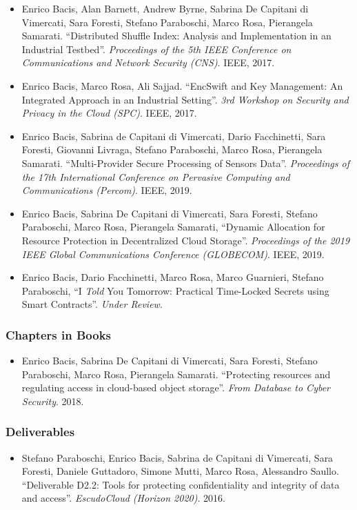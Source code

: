 \documentclass[a4paper]{article}
\begin{document}
\begin{sloppy}
\begin{itemize}
		\item Enrico Bacis, Alan Barnett, Andrew Byrne, Sabrina De Capitani di Vimercati, Sara Foresti, Stefano Paraboschi, Marco Rosa, Pierangela Samarati. ``Distributed Shuffle Index: Analysis and Implementation in an Industrial Testbed''. {\em Proceedings of the 5th IEEE Conference on Communications and Network Security (CNS)}. IEEE, 2017.
		
		\item Enrico Bacis, Marco Rosa, Ali Sajjad. ``EncSwift and Key Management: An Integrated Approach in an Industrial Setting''. {\em 3rd Workshop on Security and Privacy in the Cloud (SPC)}. IEEE, 2017.
		
		\item  Enrico Bacis, Sabrina de Capitani di Vimercati, Dario Facchinetti, Sara Foresti, Giovanni Livraga, Stefano Paraboschi, Marco Rosa, Pierangela Samarati. ``Multi-Provider Secure Processing of Sensors Data''. {\em Proceedings of the 17th International Conference on Pervasive Computing and Communications (Percom)}. IEEE, 2019.
		
		\item Enrico Bacis, Sabrina De Capitani di Vimercati, Sara Foresti, Stefano Paraboschi, Marco Rosa, Pierangela Samarati, ``Dynamic Allocation for Resource Protection in Decentralized Cloud Storage''. {\em Proceedings of the 2019 IEEE Global Communications Conference (GLOBECOM)}. IEEE, 2019.
		
		\item Enrico Bacis, Dario Facchinetti, Marco Rosa, Marco Guarnieri, Stefano Paraboschi, ``I {\em Told} You Tomorrow: Practical Time-Locked Secrets using Smart Contracts''. {\em Under Review}.
	\end{itemize}
	
	\subsubsection*{Chapters in Books}
	\begin{itemize}
		\item  Enrico Bacis,	Sabrina De Capitani di Vimercati, Sara Foresti,	Stefano Paraboschi,	Marco Rosa,	Pierangela Samarati. ``Protecting resources and regulating access in cloud-based object storage''. {\em From Database to Cyber Security}. 2018.
	\end{itemize}
	
	\subsubsection*{Deliverables}
	\begin{itemize}
		\item Stefano Paraboschi, Enrico Bacis, Sabrina de Capitani di Vimercati, Sara Foresti, Daniele Guttadoro, Simone Mutti, Marco Rosa, Alessandro Saullo. ``Deliverable D2.2: Tools for protecting confidentiality and integrity of data and access''. {\em EscudoCloud (Horizon 2020)}. 2016.
		

\end{itemize}
\end{sloppy}
\end{document}
